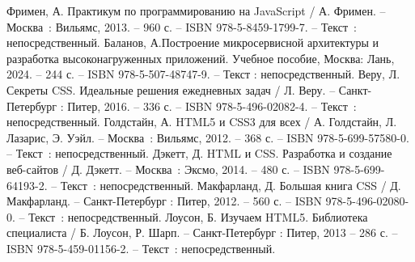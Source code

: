 
\begin{thebibliography}{9}
	
     Фримен, А. Практикум по программированию на JavaScript / А. Фримен. – Москва~: Вильямс, 2013. – 960 с. – ISBN 978-5-8459-1799-7. – Текст~: непосредственный.
    Баланов, А.Построение микросервисной архитектуры и разработка высоконагруженных приложений. Учебное пособие, Москва: Лань, 2024. – 244 с. – ISBN 978-5-507-48747-9. – Текст : непосредственный.
     Веру, Л. Секреты CSS. Идеальные решения ежедневных задач / Л. Веру. – Санкт-Петербург : Питер, 2016. – 336 с. – ISBN 978-5-496-02082-4. – Текст~: непосредственный.
		Голдстайн, А. HTML5 и CSS3 для всех / А. Голдстайн, Л. Лазарис, Э. Уэйл. – Москва~: Вильямс, 2012. – 368 с. – ISBN 978-5-699-57580-0. – Текст~: непосредственный.
		Дэкетт, Д. HTML и CSS. Разработка и создание веб-сайтов / Д. Дэкетт. – Москва~: Эксмо, 2014. – 480 с. – ISBN 978-5-699-64193-2. – Текст~: непосредственный.
		Макфарланд, Д. Большая книга CSS / Д. Макфарланд. – Санкт-Петербург : Питер, 2012. – 560 с. – ISBN 978-5-496-02080-0. – Текст~: непосредственный.
		Лоусон, Б. Изучаем HTML5. Библиотека специалиста / Б. Лоусон, Р. Шарп. – Санкт-Петербург : Питер, 2013 – 286 с. – ISBN 978-5-459-01156-2. – Текст~: непосредственный.
	
\end{thebibliography}
